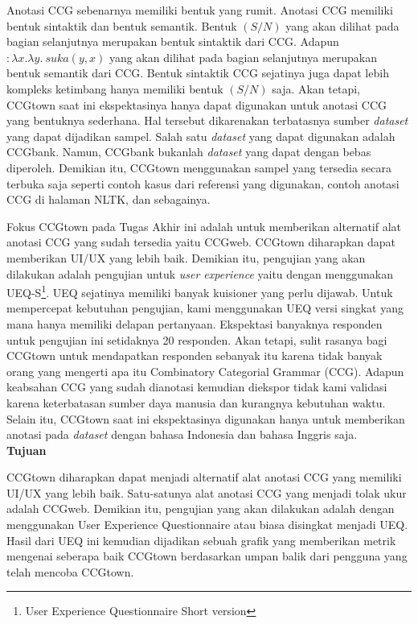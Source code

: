 Anotasi CCG sebenarnya memiliki bentuk yang rumit. Anotasi CCG memiliki bentuk sintaktik dan
bentuk semantik. Bentuk $(S/N)$ yang akan dilihat pada bagian selanjutnya merupakan bentuk sintaktik
dari CCG. Adapun $: \lambda x.\lambda y.\ suka(y, x)$ yang akan dilihat pada bagian selanjutnya
merupakan bentuk semantik dari CCG. Bentuk sintaktik CCG sejatinya juga dapat lebih kompleks
ketimbang hanya memiliki bentuk $(S/N)$ saja. Akan tetapi, CCGtown saat ini ekspektasinya hanya
dapat digunakan untuk anotasi CCG yang bentuknya sederhana. Hal tersebut dikarenakan terbatasnya
sumber \textit{dataset} yang dapat dijadikan sampel. Salah satu \textit{dataset} yang dapat digunakan
adalah CCGbank. Namun, CCGbank bukanlah \textit{dataset} yang dapat dengan bebas diperoleh.
Demikian itu, CCGtown menggunakan sampel yang tersedia secara terbuka saja seperti contoh kasus
dari referensi yang digunakan, contoh anotasi CCG di halaman NLTK, dan sebagainya.

Fokus CCGtown pada Tugas Akhir ini adalah untuk memberikan alternatif alat anotasi CCG yang sudah
tersedia yaitu CCGweb. CCGtown diharapkan dapat memberikan UI/UX yang lebih baik. Demikian itu,
pengujian yang akan dilakukan adalah pengujian untuk \textit{user experience} yaitu dengan
menggunakan UEQ-S\footnote{User Experience Questionnaire Short version}. UEQ sejatinya memiliki
banyak kuisioner yang perlu dijawab. Untuk mempercepat kebutuhan pengujian, kami menggunakan
UEQ versi singkat yang mana hanya memiliki delapan pertanyaan\citep{UEQ-S}. Ekspektasi banyaknya
responden untuk pengujian ini setidaknya 20 responden. Akan tetapi, sulit rasanya bagi CCGtown untuk
mendapatkan responden sebanyak itu karena tidak banyak orang yang mengerti apa itu Combinatory
Categorial Grammar (CCG). Adapun keabsahan CCG yang sudah dianotasi kemudian diekspor tidak
kami validasi karena keterbatasan sumber daya manusia dan kurangnya kebutuhan waktu.
Selain itu, CCGtown saat ini ekspektasinya digunakan hanya untuk memberikan anotasi pada
\textit{dataset} dengan bahasa Indonesia dan bahasa Inggris saja.
\\


\noindent\textbf{Tujuan}

CCGtown diharapkan dapat menjadi alternatif alat anotasi CCG yang memiliki UI/UX yang lebih baik.
Satu-satunya alat anotasi CCG yang menjadi tolak ukur adalah CCGweb.
Demikian itu, pengujian yang akan dilakukan adalah dengan menggunakan User Experience Questionnaire
atau biasa disingkat menjadi UEQ. Hasil dari UEQ ini kemudian dijadikan sebuah grafik yang memberikan
metrik mengenai seberapa baik CCGtown berdasarkan umpan balik dari pengguna yang telah mencoba
CCGtown.
\\


